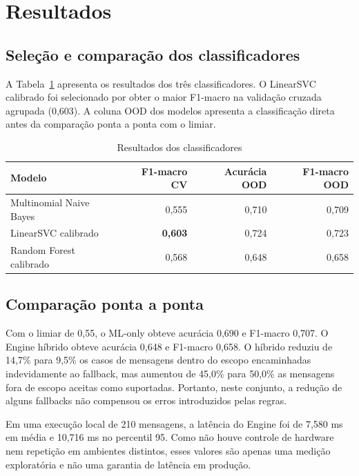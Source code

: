\documentclass[conference]{IEEEtran}
\begin{document}
\section{Resultados}

\subsection{Seleção e comparação dos classificadores}

A Tabela~\ref{tab:model-results} apresenta os resultados dos três classificadores. O LinearSVC calibrado foi selecionado por obter o maior F1-macro na validação cruzada agrupada (0,603). A coluna OOD dos modelos apresenta a classificação direta antes da comparação ponta a ponta com o limiar.

\begin{table}[t]
\centering
\caption{Resultados dos classificadores}
\label{tab:model-results}
\scriptsize
\begin{tabular}{lrrr}
\toprule
Modelo & F1-macro CV & Acurácia OOD & F1-macro OOD \\
\midrule
Multinomial Naive Bayes & 0,555 & 0,710 & 0,709 \\
LinearSVC calibrado & \textbf{0,603} & 0,724 & 0,723 \\
Random Forest calibrado & 0,568 & 0,648 & 0,658 \\
\bottomrule
\end{tabular}
\end{table}

\subsection{Comparação ponta a ponta}

Com o limiar de 0,55, o ML-only obteve acurácia 0,690 e F1-macro 0,707. O Engine híbrido obteve acurácia 0,648 e F1-macro 0,658. O híbrido reduziu de 14,7\% para 9,5\% os casos de mensagens dentro do escopo encaminhadas indevidamente ao fallback, mas aumentou de 45,0\% para 50,0\% as mensagens fora de escopo aceitas como suportadas. Portanto, neste conjunto, a redução de alguns fallbacks não compensou os erros introduzidos pelas regras.

Em uma execução local de 210 mensagens, a latência do Engine foi de 7,580 ms em média e 10,716 ms no percentil 95. Como não houve controle de hardware nem repetição em ambientes distintos, esses valores são apenas uma medição exploratória e não uma garantia de latência em produção.
\end{document}
